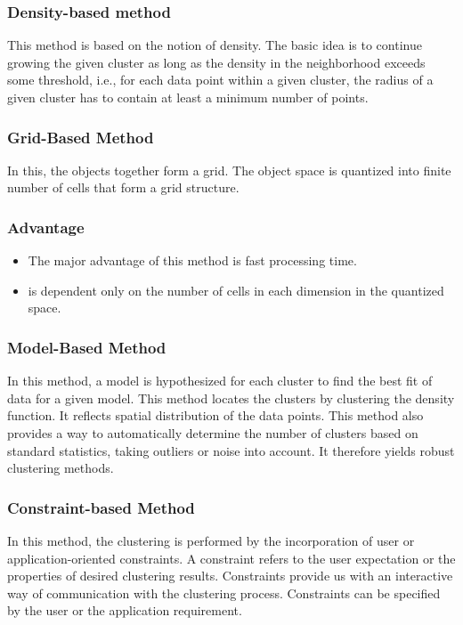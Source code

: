 \documentclass{article}
\begin{document}
\subsubsection{Density-based method}\label{clustering methods}
This method is based on the notion of density. The basic idea is to continue growing the given cluster as long as the density in the neighborhood exceeds some threshold, i.e., for each data point within a given cluster, the radius of a given cluster has to contain at least a minimum number of points.\pagebreak

\subsubsection{Grid-Based Method}\label{clustering methods}
In this, the objects together form a grid. The object space is quantized into finite number of cells that form a grid structure.
\subsubsection*{Advantage}\label{Grid-Based Method}
\begin{itemize}
\item The major advantage of this method is fast processing time.
\item is dependent only on the number of cells in each dimension in the quantized space.
\end{itemize}

\subsubsection{Model-Based Method}\label{clustering methods}

In this method, a model is hypothesized for each cluster to find the best fit of data for a given model. This method locates the clusters by clustering the density function. It reflects spatial distribution of the data points.
This method also provides a way to automatically determine the number of clusters based on standard statistics, taking outliers or noise into account. It therefore yields robust clustering methods.

\subsubsection{Constraint-based Method}\label{clustering methods}

In this method, the clustering is performed by the incorporation of user or application-oriented constraints. A constraint refers to the user expectation or the properties of desired clustering results. Constraints provide us with an interactive way of communication with the clustering process. Constraints can be specified by the user or the application requirement.
\end{document}

